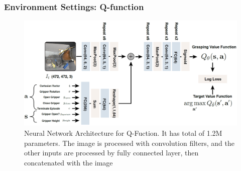 \documentclass{beamer}
\newcommand{\fifthSec}{Environment Settings}
\begin{document}
    \begin{frame}
      \frametitle{\fifthSec : Q-function}
      \begin{figure}
        \centering
        \includegraphics[width = \linewidth]{Images/QFunctionNetwork.png}
        \caption{Neural Network Architecture for Q-Fuction. \linebreak
                 It has total of 1.2M parameters. The image is processed with convolution filters,
                 and the other inputs are processed by fully connected layer, then concatenated with the image}
        \label{fig:QFunctionNetwork}
      \end{figure}
    \end{frame}
\end{document}
